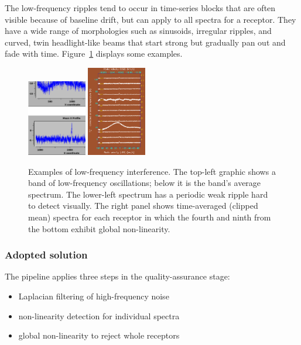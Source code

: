 \documentclass[final,authoryear,5p,times,twocolumn]{elsarticle}
\begin{document}
The low-frequency ripples tend to occur in time-series blocks that are
often visible because of baseline drift, but can apply to all spectra
for a receptor. They have a wide range of morphologies such as
sinusoids, irregular ripples, and curved, twin headlight-like beams
that start strong but gradually pan out and fade with time.
Figure~\ref{fig:badbase:interference} displays some examples.

\begin{figure}[!ht]
\includegraphics[width=0.23\textwidth]{P61_f2a}
\includegraphics[width=0.23\textwidth]{P61_f2b}
\caption{Examples of low-frequency interference.  The top-left graphic
  shows a band of low-frequency oscillations; below it is the band's
  average spectrum.  The lower-left spectrum has a periodic weak
  ripple hard to detect visually.  The right panel shows time-averaged
  (clipped mean) spectra for each receptor in which the fourth and
  ninth from the bottom exhibit global non-linearity.}
\label{fig:badbase:interference}
\end{figure}

\subsubsection{Adopted solution}

The pipeline applies three steps in the quality-assurance stage:
\begin{itemize}
\item Laplacian filtering of high-frequency noise
\item non-linearity detection for individual spectra
\item global non-linearity to reject whole receptors
\end{itemize}
\end{document}
